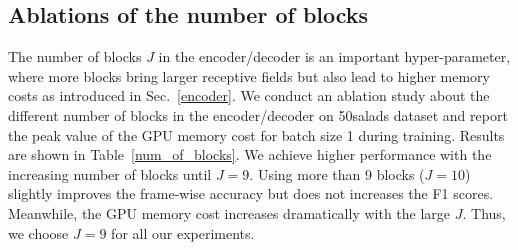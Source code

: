 \documentclass{bmvc2k}
\begin{document}
\subsection{Ablations of the number of blocks}
The number of blocks ${J}$ in the encoder/decoder is an important hyper-parameter, where more blocks bring larger receptive fields but also lead to higher memory costs as introduced in Sec.~\ref{encoder}. We conduct an ablation study about the different number of blocks in the encoder/decoder on 50salads dataset and report the peak value of the GPU memory cost for batch size 1 during training. Results are shown in Table~\ref{num_of_blocks}. We achieve higher performance with the increasing number of blocks until ${J}=9$. Using more than 9 blocks ($J=10$) slightly improves the frame-wise accuracy but does not increases the F1 scores. Meanwhile, the GPU memory cost increases dramatically with the large $J$. Thus, we choose ${J}=9$ for all our experiments.
\end{document}
